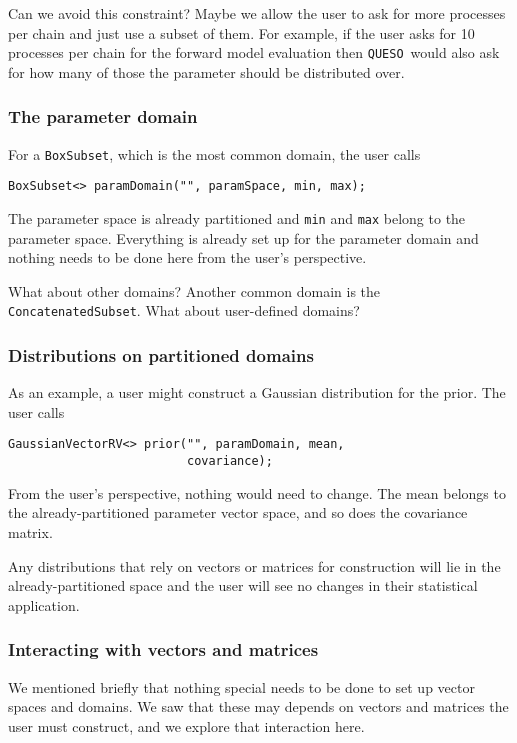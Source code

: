 \documentclass{article}
\newcommand{\Queso}{\texttt{QUESO}}
\begin{document}
Can we avoid this constraint?  Maybe we allow the user to ask for more
processes per chain and just use a subset of them.  For example, if the user
asks for 10 processes per chain for the forward model evaluation then \Queso\
would also ask for how many of those the parameter should be distributed over.

\subsubsection{The parameter domain}

For a \lstinline|BoxSubset|, which is the most common domain, the user calls
\begin{lstlisting}
BoxSubset<> paramDomain("", paramSpace, min, max);
\end{lstlisting}
The parameter space is already partitioned and \lstinline|min| and
\lstinline|max| belong to the parameter space.  Everything is already set up
for the parameter domain and nothing needs to be done here from the user's
perspective.

What about other domains?  Another common domain is the
\lstinline|ConcatenatedSubset|.  What about user-defined domains?

\subsubsection{Distributions on partitioned domains}

As an example, a user might construct a Gaussian distribution for the prior.
The user calls
\begin{lstlisting}
GaussianVectorRV<> prior("", paramDomain, mean,
                         covariance);
\end{lstlisting}
From the user's perspective, nothing would need to change.  The mean belongs
to the already-partitioned parameter vector space, and so does the covariance
matrix.

Any distributions that rely on vectors or matrices for construction will lie
in the already-partitioned space and the user will see no changes in their
statistical application.

\subsubsection{Interacting with vectors and matrices}

We mentioned briefly that nothing special needs to be done to set up vector
spaces and domains.  We saw that these may depends on vectors and matrices the
user must construct, and we explore that interaction here.
\end{document}
